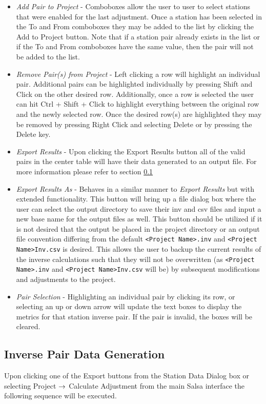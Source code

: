 \begin{itemize}
	\item \emph{Add Pair to Project} - Comboboxes allow the user to user to select stations that were enabled for the last adjustment. Once a station has been selected in the To and From comboboxes they may be added to the list by clicking the Add to Project button. Note that if a station pair already exists in the list or if the To and From comboboxes have the same value, then the pair will not be added to the list.
	\item \emph{Remove Pair(s) from Project} - Left clicking a row will highlight an individual pair. Additional pairs can be highlighted individually by pressing Shift and Click on the other desired row. Additionally, once a row is selected the user can hit Ctrl + Shift + Click to highlight everything between the original row and the newly selected row. Once the desired row(s) are highlighted they may be removed by pressing Right Click and selecting Delete or by pressing the Delete key.
	\item \emph{Export Results} - Upon clicking the Export Results button all of the valid pairs in the center table will have their data generated to an output file. For more information please refer to section \ref{sect:InverseGen}
	\item \emph{Export Results As} - Behaves in a similar manner to \emph{Export Results} but with extended functionality. This button will bring up a file dialog box where the user can select the output directory to save their inv and csv files and input a new base name for the output files as well. This button should be utilized if it is not desired that the output be placed in the project directory or an output file convention differing from the default \verb+<Project Name>.inv+ and \verb+<Project Name>Inv.csv+ is desired. This allows the user to backup the current results of the inverse calculations such that they will not be overwritten (as \verb+<Project Name>.inv+ and \verb+<Project Name>Inv.csv+ will be) by subsequent modifications and adjustments to the project.
	\item \emph{Pair Selection} - Highlighting an individual pair by clicking its row, or selecting an up or down arrow will update the text boxes to display the metrics for that station inverse pair. If the pair is invalid, the boxes will be cleared.
\end{itemize}

\subsection{Inverse Pair Data Generation} \label{sect:InverseGen}
Upon clicking one of the Export buttons from the Station Data Dialog box or selecting Project $\rightarrow$ Calculate Adjustment from the main Salsa interface the following sequence will be executed.

